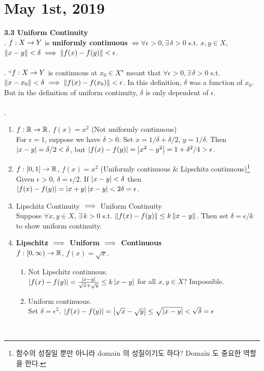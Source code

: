 \section*{May 1st, 2019}
\textbf{3.3 Uniform Continuity}\\
. $f:X\rightarrow Y$ is \textbf{uniformly continuous} $\iff \forall \epsilon>0, \exists\,\delta>0$ s.t. $x, y\in X$, $\left\lVert x - y\right\rVert < \delta \implies \left\lVert f(x) - f(y)\right\rVert < \epsilon$.\\
\\
\rmk. ``$f:X\rightarrow Y$ is continuous at $x_0\in X$" meant that $\forall \epsilon > 0, \exists\,\delta > 0$ s.t. $\left\lVert x - x_0\right\rVert < \delta \implies \left\lVert f(x) - f(x_0)\right\rVert < \epsilon$. In this definition, $\delta$ was a function of $x_0$. But in the definition of uniform continuity, $\delta$ is only dependent of $\epsilon$.\\
\\
\ex.
\begin{enumerate}
	\item $f:\mathbb{R}\rightarrow\mathbb{R}$, $f(x) = x^2$ (Not uniformly continuous)\\
	For $\epsilon = 1$, suppose we have $\delta > 0$. Set $x = 1/\delta + \delta /2$, $y = 1/\delta$. Then $\left|x - y\right| = \delta / 2 < \delta$, but $\left|f(x) - f(y)\right| = \left|x^2-y^2\right| = 1 + \delta^2/4 > \epsilon$.
	\item $f:[0, 1]\rightarrow \mathbb{R}$, $f(x) = x^2$ (Uniformly continuous \& Lipschitz continuous)\footnote{함수의 성질일 뿐만 아니라 domain 의 성질이기도 하다? Domain 도 중요한 역할을 한다.}\\
	Given $\epsilon > 0$, $\delta = \epsilon / 2$. If $\left|x - y\right| < \delta$ then $\left|f(x) - f(y)\right| = \left|x + y\right| \left|x - y\right| < 2\delta =\epsilon$.
	\item Lipschitz Continuity $\implies$ Uniform Continuity\\
	Suppose $\forall x, y\in X$, $\exists\,k>0$ s.t. $\left\lVert f(x) - f(y)\right\rVert \leq k\left\lVert x -y\right\rVert$. Then set $\delta = \epsilon / k$ to show uniform continuity.
	\item \textbf{Lipschitz $\implies$ Uniform $\implies$ Continuous}\\
	$f:[0, \infty) \rightarrow \mathbb{R}$, $f(x) = \sqrt{x}$.
	\begin{enumerate}
		\item Not Lipschitz continuous.\\
		$\left|f(x) - f(y)\right| = \frac{\left|x-y\right|}{\sqrt{x}+\sqrt{y}} \leq k\left|x - y\right|$ for all $x, y\in X$? Impossible.
		\item Uniform continuous.\\
		Set $\delta = \epsilon^2$. $\left|f(x) - f(y)\right| = \left|\sqrt{x} - \sqrt{y}\right| \leq \sqrt{\left|x - y\right|} < \sqrt{\delta} = \epsilon$
	\end{enumerate}
\end{enumerate}~\\
